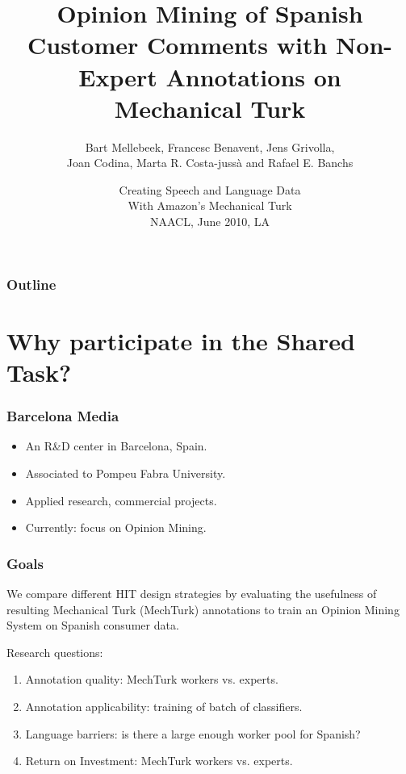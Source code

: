 \documentclass[10pt]{beamer}
\title{Opinion Mining of Spanish Customer Comments with Non-Expert Annotations on\\ Mechanical Turk}
\author{Bart Mellebeek, Francesc Benavent, Jens Grivolla,\\ Joan Codina, Marta R. Costa-juss\`{a} and  Rafael E. Banchs}
\institute
{
  Barcelona Media Centre d'Innovaci\'{o}\\ \vspace{.2cm}
  \pgfuseimage{bmlogo}
}
\date{Creating Speech and Language Data\\ With Amazon's Mechanical Turk\\ \vspace{.2cm} NAACL, June 2010, LA}
\newenvironment{itemwide}%
{\begin{itemize}%
    \setlength{\itemsep}{5pt}%
    \setlength{\parskip}{5pt}}%
  {\end{itemize}}
\begin{document}
\frame{\titlepage}

\begin{frame}
  \frametitle{Outline}
  \tableofcontents
\end{frame}


\section{Why participate in the Shared Task?}

\begin{frame}
  \frametitle{Barcelona Media}

\begin{itemwide}
 \item An R\&D center in Barcelona, Spain.
 \item Associated to Pompeu Fabra University.
 \item Applied research, commercial projects.
 \item Currently: focus on Opinion Mining.
\end{itemwide}

\end{frame}


\begin{frame}
  \frametitle{Goals}
We compare different HIT design strategies by evaluating the usefulness of resulting Mechanical Turk (MechTurk) annotations to train an Opinion Mining System on Spanish consumer data.\\

\vspace{1cm}

\begin{block}{Research questions:}
 \begin{enumerate}
 \item Annotation quality: MechTurk workers vs. experts.
 \item Annotation applicability: training of batch of classifiers.
 \item Language barriers: is there a large enough worker pool for Spanish?
 \item Return on Investment: MechTurk workers vs. experts.
\end{enumerate}
\end{block}

\end{frame}
\end{document}
